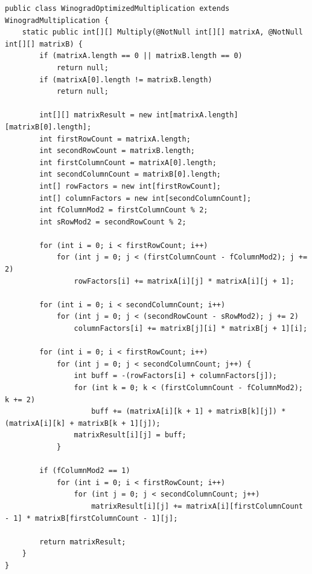 \documentclass[12pt]{report}
\begin{document}
\begin{lstlisting}[label=some-code,caption=Оптимизированный алгоритм Винограда]
public class WinogradOptimizedMultiplication extends WinogradMultiplication {
    static public int[][] Multiply(@NotNull int[][] matrixA, @NotNull int[][] matrixB) {
        if (matrixA.length == 0 || matrixB.length == 0)
            return null;
        if (matrixA[0].length != matrixB.length)
            return null;

        int[][] matrixResult = new int[matrixA.length][matrixB[0].length];
        int firstRowCount = matrixA.length;
        int secondRowCount = matrixB.length;
        int firstColumnCount = matrixA[0].length;
        int secondColumnCount = matrixB[0].length;
        int[] rowFactors = new int[firstRowCount];
        int[] columnFactors = new int[secondColumnCount];
        int fColumnMod2 = firstColumnCount % 2;
        int sRowMod2 = secondRowCount % 2;

        for (int i = 0; i < firstRowCount; i++)
            for (int j = 0; j < (firstColumnCount - fColumnMod2); j += 2)
                rowFactors[i] += matrixA[i][j] * matrixA[i][j + 1];

        for (int i = 0; i < secondColumnCount; i++)
            for (int j = 0; j < (secondRowCount - sRowMod2); j += 2)
                columnFactors[i] += matrixB[j][i] * matrixB[j + 1][i];

        for (int i = 0; i < firstRowCount; i++)
            for (int j = 0; j < secondColumnCount; j++) {
                int buff = -(rowFactors[i] + columnFactors[j]);
                for (int k = 0; k < (firstColumnCount - fColumnMod2); k += 2)
                    buff += (matrixA[i][k + 1] + matrixB[k][j]) * (matrixA[i][k] + matrixB[k + 1][j]);
                matrixResult[i][j] = buff;
            }

        if (fColumnMod2 == 1)
            for (int i = 0; i < firstRowCount; i++)
                for (int j = 0; j < secondColumnCount; j++)
                    matrixResult[i][j] += matrixA[i][firstColumnCount - 1] * matrixB[firstColumnCount - 1][j];

        return matrixResult;
    }
}

\end{lstlisting}
\end{document}
